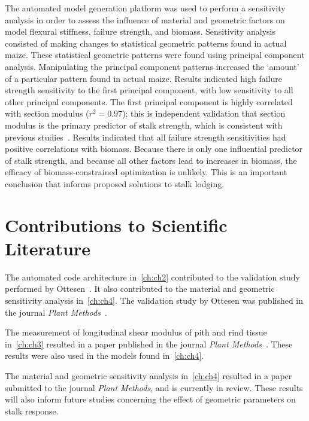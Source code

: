 The automated model generation platform was used to perform a sensitivity analysis in order to assess the influence of material and geometric factors on model flexural stiffness, failure strength, and biomass. Sensitivity analysis consisted of making changes to statistical geometric patterns found in actual maize. These statistical geometric patterns were found using principal component analysis. Manipulating the principal component patterns increased the ‘amount’ of a particular pattern found in actual maize. Results indicated high failure strength sensitivity to the first principal component, with low sensitivity to all other principal components. The first principal component is highly correlated with section modulus (${r^{2}=0.97}$);  this is independent validation that section modulus is the primary predictor of stalk strength, which is consistent with previous studies~. Results indicated that all failure strength sensitivities had positive correlations with biomass. Because there is only one influential predictor of stalk strength, and because all other factors lead to increases in biomass, the efficacy of biomass-constrained optimization is unlikely. This is an important conclusion that informs proposed solutions to stalk lodging.

\section{Contributions to Scientific Literature}
\label{sec:contributions_to_scientific_literature}
The automated code architecture in~\cref{ch:ch2} contributed to the validation study performed by Ottesen~. It also contributed to the material and geometric sensitivity analysis in~\cref{ch:ch4}. The validation study by Ottesen was published in the journal \textit{Plant Methods}~.

The measurement of longitudinal shear modulus of pith and rind tissue in~\cref{ch:ch3} resulted in a paper published in the journal \textit{Plant Methods}~. These results were also used in the models found in~\cref{ch:ch4}.

The material and geometric sensitivity analysis in~\cref{ch:ch4} resulted in a paper submitted to the journal \textit{Plant Methods}, and is currently in review. These results will also inform future studies concerning the effect of geometric parameters on stalk response.

